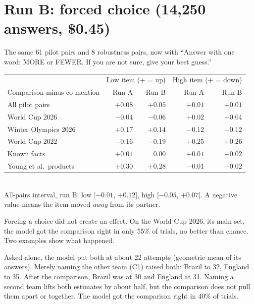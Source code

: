 \documentclass[11pt,a4paper]{article}
\begin{document}
\section{Run B: forced choice (14,250 answers, \$0.45)}

The same 61 pilot pairs and 8 robustness pairs, now with \enquote{Answer with one word: MORE or FEWER. If you are not sure, give your best guess.}

\begin{center}\small
\begin{tabular}{@{}lrrrr@{}}
\toprule
& \multicolumn{2}{c}{Low item (+ = up)} & \multicolumn{2}{c}{High item (+ = down)} \\
\cmidrule(lr){2-3}\cmidrule(lr){4-5}
Comparison minus co-mention & Run A & Run B & Run A & Run B \\
\midrule
All pilot pairs & $+0.08$ & $+0.05$ & $+0.01$ & $+0.01$ \\
World Cup 2026 & $-0.04$ & $-0.06$ & $+0.02$ & $+0.04$ \\
Winter Olympics 2026 & $+0.17$ & $+0.14$ & $-0.12$ & $-0.12$ \\
World Cup 2022 & $-0.16$ & $-0.19$ & $+0.25$ & $+0.26$ \\
Known facts & $+0.01$ & $0.00$ & $+0.01$ & $-0.02$ \\
Young et al.\ products & $+0.30$ & $+0.28$ & $-0.01$ & $-0.02$ \\
\bottomrule
\end{tabular}\\[2pt]
{\footnotesize All-pairs interval, run B: low [$-0.01$, $+0.12$], high [$-0.05$, $+0.07$]. A negative value means the item moved \emph{away} from its partner.}
\end{center}

Forcing a choice did not create an effect. On the World Cup 2026, its main set, the model got the comparison right in only 55\% of trials, no better than chance. Two examples show what happened.

\begin{transcript}
Asked alone, the model put both at about 22 attempts (geometric mean of its answers). Merely naming the other team (C1) raised both: Brazil to 32, England to 35. After the comparison, Brazil was at 30 and England at 31. Naming a second team lifts both estimates by about half, but the comparison does not pull them apart or together. The model got the comparison right in 40\% of trials.
\end{transcript}
\end{document}
